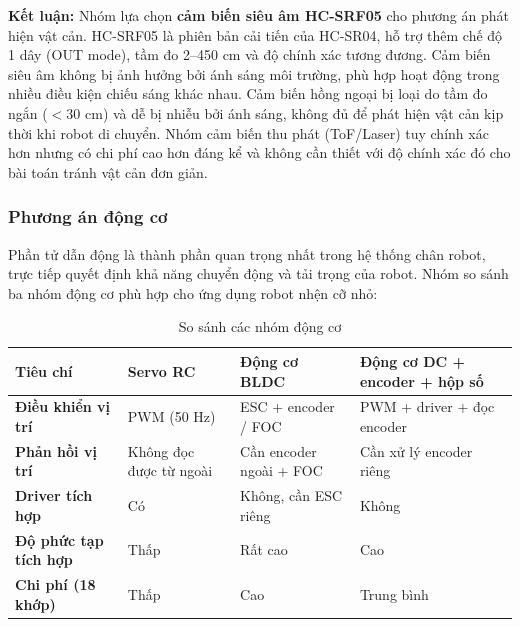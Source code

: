            \textbf{Kết luận:} Nhóm lựa chọn \textbf{cảm biến siêu âm HC-SRF05} cho phương án phát hiện vật cản. HC-SRF05 là phiên bản cải tiến của HC-SR04, hỗ trợ thêm chế độ 1 dây (OUT mode), tầm đo 2--450 cm và độ chính xác tương đương. Cảm biến siêu âm không bị ảnh hưởng bởi ánh sáng môi trường, phù hợp hoạt động trong nhiều điều kiện chiếu sáng khác nhau. Cảm biến hồng ngoại bị loại do tầm đo ngắn ($<$30 cm) và dễ bị nhiễu bởi ánh sáng, không đủ để phát hiện vật cản kịp thời khi robot di chuyển. Nhóm cảm biến thu phát (ToF/Laser) tuy chính xác hơn nhưng có chi phí cao hơn đáng kể và không cần thiết với độ chính xác đó cho bài toán tránh vật cản đơn giản.

                        \subsubsection{Phương án động cơ}

            \hspace{0.5cm} Phần tử dẫn động là thành phần quan trọng nhất trong hệ thống chân robot, trực tiếp quyết định khả năng chuyển động và tải trọng của robot. Nhóm so sánh ba nhóm động cơ phù hợp cho ứng dụng robot nhện cỡ nhỏ:

            \begin{table}[H]
            \centering
            \caption{So sánh các nhóm động cơ}
            \label{tab:motor_options}
            \begin{tabular}{|>{\centering\arraybackslash}m{2.5cm}|>{\centering\arraybackslash}m{3.8cm}|>{\centering\arraybackslash}m{3.8cm}|>{\centering\arraybackslash}m{3.8cm}|}
            \hline
            \textbf{Tiêu chí} & \textbf{Servo RC} & \textbf{Động cơ BLDC} & \textbf{Động cơ DC + encoder + hộp số} \\
            \hline
            \textbf{Điều khiển vị trí} & PWM (50 Hz) & ESC + encoder / FOC & PWM + driver + đọc encoder \\
            \hline
            \textbf{Phản hồi vị trí} & Không đọc được từ ngoài & Cần encoder ngoài + FOC & Cần xử lý encoder riêng \\
            \hline
            \textbf{Driver tích hợp} & Có & Không, cần ESC riêng & Không \\
            \hline
            \textbf{Độ phức tạp tích hợp} & Thấp & Rất cao & Cao \\
            \hline
            \textbf{Chi phí (18 khớp)} & Thấp & Cao & Trung bình \\
            \hline
            \end{tabular}
            \end{table}

